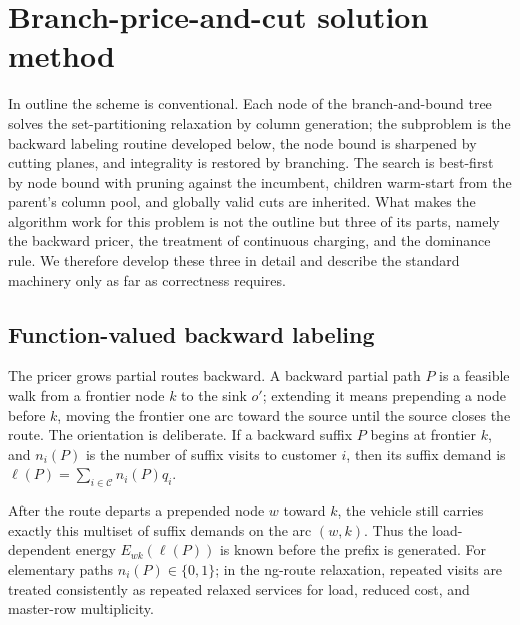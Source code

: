 \documentclass[review,3p,authoryear]{elsarticle}
\theoremstyle{plain}
\theoremstyle{definition}
\theoremstyle{remark}
\newcommand{\C}{\mathcal{C}}
\begin{document}
\section{Branch-price-and-cut solution method}
\label{sec:bpc}

In outline the scheme is conventional. Each node of the branch-and-bound tree
solves the set-partitioning relaxation by column generation; the subproblem is the
backward labeling routine developed below, the node bound is sharpened by cutting
planes, and integrality is restored by branching. The search is best-first by node
bound with pruning against the incumbent, children warm-start from the parent's
column pool, and globally valid cuts are inherited. What makes the algorithm work
for this problem is not the outline but three of its parts, namely the backward pricer,
the treatment of continuous charging, and the dominance rule. We therefore develop
these three in detail and describe the standard machinery only as far as
correctness requires.

\subsection{Function-valued backward labeling}
\label{sec:labeling}

The pricer grows partial routes backward. A backward partial path $P$ is a feasible
walk from a frontier node $k$ to the sink $o'$; extending it means prepending
a node before $k$, moving the frontier one arc toward the source until the source
closes the route. The orientation is deliberate. If a backward suffix $P$ begins at
frontier $k$, and $n_i(P)$ is the number of suffix visits to customer $i$, then its
suffix demand is $ \ell(P)=\sum_{i\in\C} n_i(P)q_i .$

After the route departs a prepended node $w$ toward $k$, the vehicle still carries
exactly this multiset of suffix demands on the arc $(w,k)$. Thus the load-dependent
energy $E_{wk}(\ell(P))$ is known before the prefix is generated. For elementary
paths $n_i(P)\in\{0,1\}$; in the ng-route relaxation, repeated visits are treated
consistently as repeated relaxed services for load, reduced cost, and master-row
multiplicity.
\end{document}
